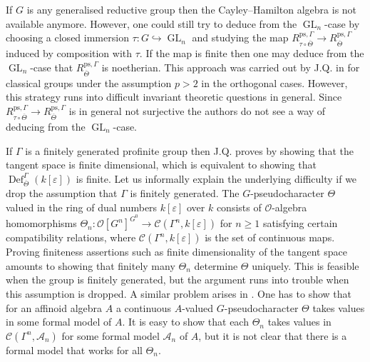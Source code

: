 \documentclass{amsart}
\theoremstyle{definition}
\theoremstyle{remark}
\DeclareMathOperator{\GL}{GL}
\DeclareMathOperator{\Def}{Def}
\newcommand{\OO}{\mathcal O}
\newcommand{\Thetabar}{\overline{\Theta}}
\newcommand{\ps}{\mathrm{ps}}
\begin{document}
If $G$ is
any generalised reductive group then the Cayley--Hamilton algebra is not available
anymore. However, one could still try to deduce   from the $\GL_n$-case 
by choosing a 
closed immersion $\tau: G\hookrightarrow \GL_n$ and studying the map 
$R^{\ps, \Gamma}_{\tau\circ \Thetabar} \rightarrow R^{\ps, \Gamma}_{\Thetabar}$ 
induced by composition with $\tau$. If the map is finite then one may deduce from 
the $\GL_n$-case 
that $R^{\ps, \Gamma}_{\Thetabar}$ is noetherian. This approach was carried out by 
J.Q. in \cite[Section 5.3]{quast} for classical groups under the assumption $p>2$ in 
the orthogonal cases. However, this strategy runs into difficult invariant theoretic questions in
general. Since $R^{\ps, \Gamma}_{\tau\circ \Thetabar} \rightarrow R^{\ps,\Gamma}_{\Thetabar}$ 
is in general not surjective the authors do not see a way of deducing 
from the $\GL_n$-case. 


If $\Gamma$ is a finitely generated profinite group then J.Q. proves 
by showing that the tangent space is finite dimensional, which is equivalent to 
showing that $\Def_{\Thetabar}^{\Gamma}(k[\varepsilon])$ is finite. Let us informally explain the underlying difficulty if we drop the assumption that $\Gamma$ is finitely generated. The $G$-pseudocharacter $\Theta$ 
valued in the ring of dual numbers $k[\varepsilon]$ over $k$ consists of $\OO$-algebra homomorphisms 
$\Theta_n: \OO[G^n]^{G^0} \rightarrow \mathcal C(\Gamma^n, k[\varepsilon])$ for 
$n\ge 1$ satisfying certain compatibility relations, where $\mathcal C(\Gamma^n, k[\varepsilon])$ is the set of continuous maps. Proving finiteness assertions such as finite dimensionality of the tangent space amounts to showing that finitely many $\Theta_n$ determine $\Theta$ uniquely. This is feasible when the group is finitely 
generated, but the argument runs into trouble when this assumption is dropped. A similar problem arises in . One has to show that for 
an affinoid algebra $A$ a continuous $A$-valued $G$-pseudocharacter  $\Theta$ takes 
values in some formal model of $A$. It is easy to show that each $\Theta_n$ takes 
values in $\mathcal C(\Gamma^n, \mathcal A_n)$ for some formal model $\mathcal A_n$ 
of $A$, but it is not clear that there is a formal model that works for all $\Theta_n$. 
\end{document}
